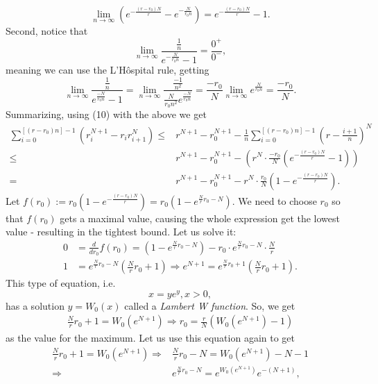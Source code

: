     \[
        \lim_{n\rightarrow\infty}\left(e^{-\frac{(r-r_0)N}{r}} - e^{-\frac{N}{r_0n}}\right)=e^{-\frac{(r-r_0)N}{r}} - 1.
    \]
    Second, notice that
    \[
        \lim_{n\rightarrow\infty}\frac{\frac{1}{n}}{e^{-\frac{N}{r_0n}} - 1}=\frac{0^+}{0^-},
    \]
    meaning we can use the L'H\^ospital rule, getting
    \[
    \lim_{n\rightarrow\infty}\frac{\frac{1}{n}} {e^{\frac{-N}{r_0n}} - 1}
    =\lim_{n\rightarrow\infty}\frac{\frac{-1}{n^2}}{\frac{N}{r_0n^2}e^{\frac{-N}{r_0n}}}=\frac{-r_0}{N}\lim_{n\rightarrow\infty}e^{\frac{N}{r_0n}}=\frac{-r_0}{N}.
    \]
    Summarizing, using (10) with the above we get
    \begin{align}
        \sum_{i=0}^{[(r-r_0)n]-1} \left(r_i^{N+1} - r_ir_{i+1}^N\right)\leq& r^{N+1} - r_0^{N+1} -\frac{1}{n}\sum_{i=0}^{[(r-r_0)n]-1}(r-\frac{i+1}{n})^N\nonumber\\
        \leq&r^{N+1} - r_0^{N+1} - \left(r^N\cdot\frac{-r_0}{N}\left(e^{-\frac{(r-r_0)N}{r}} - 1\right)\right)\nonumber\\
        =& r^{N+1} - r_0^{N+1} - r^N\cdot\frac{r_0}{N}\left(1 - e^{-\frac{(r-r_0)N}{r}}\right).
    \end{align}
    Let $f(r_0):=r_0\left(1 - e^{-\frac{(r-r_0)N}{r}}\right)=r_0\left(1 - e^{\frac{N}{r}r_0-N}\right)$. We need to choose $r_0$ so that $f(r_0)$ gets a maximal value, causing the whole expression get the lowest value - resulting in the tightest bound. Let us solve it:
    \begin{align*}
        0&=\frac{d}{dr_0}f(r_0)=\left(1 - e^{\frac{N}{r}r_0-N}\right) - r_0\cdot e^{\frac{N}{r}r_0-N}\cdot \frac{N}{r}\\
        1&=e^{\frac{N}{r}r_0-N}(\frac{N}{r}r_0+1) \Rightarrow e^{N+1}=e^{\frac{N}{r}r_0+1}\left(\frac{N}{r}r_0+1\right).
    \end{align*}
    This type of equation, i.e.
    \[
        x=ye^y,x>0,
    \]
    has a solution $y=W_0(x)$ called a \emph{Lambert W function}. So, we get
    \begin{align*}
        \frac{N}{r}r_0+1=W_0(e^{N+1})\Rightarrow 
        r_0=\frac{r}{N}\left(W_0(e^{N+1})-1\right)
    \end{align*}
    as the value for the maximum.  Let us use this equation again to get
    \begin{align*}
        \frac{N}{r}r_0+1=W_0(e^{N+1}) 
        \Rightarrow& \frac{N}{r}r_0-N=W_0(e^{N+1})-N-1\\
        \Rightarrow& e^{\frac{N}{r}r_0-N}=e^{W_0(e^{N+1})}e^{-(N+1)},
    \end{align*}
